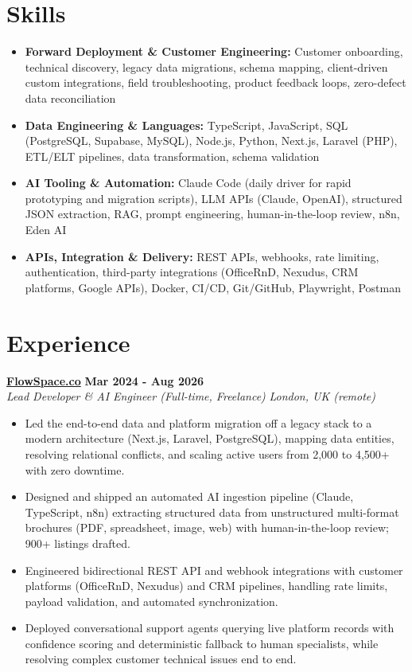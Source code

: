 \documentclass[a4paper,10pt]{article}
\newcommand{\role}[4]{%
 \textbf{#1} \hfill \textbf{#2}\\[1pt]%
 \textit{#3} \hfill \textit{#4}\\[2pt]%
}
\begin{document}
\section{Skills}
\begin{itemize}
 \item \textbf{Forward Deployment \& Customer Engineering:} Customer onboarding, technical discovery, legacy data migrations, schema mapping, client-driven custom integrations, field troubleshooting, product feedback loops, zero-defect data reconciliation
 \item \textbf{Data Engineering \& Languages:} TypeScript, JavaScript, SQL (PostgreSQL, Supabase, MySQL), Node.js, Python, Next.js, Laravel (PHP), ETL/ELT pipelines, data transformation, schema validation
 \item \textbf{AI Tooling \& Automation:} Claude Code (daily driver for rapid prototyping and migration scripts), LLM APIs (Claude, OpenAI), structured JSON extraction, RAG, prompt engineering, human-in-the-loop review, n8n, Eden AI
 \item \textbf{APIs, Integration \& Delivery:} REST APIs, webhooks, rate limiting, authentication, third-party integrations (OfficeRnD, Nexudus, CRM platforms, Google APIs), Docker, CI/CD, Git/GitHub, Playwright, Postman
\end{itemize}

\section{Experience}

\role{\href{https://flowspace.co}{FlowSpace.co}}{Mar 2024 - Aug 2026}{Lead Developer \& AI Engineer (Full-time, Freelance)}{London, UK (remote)}
\begin{itemize}
 \item Led the end-to-end data and platform migration off a legacy stack to a modern architecture (Next.js, Laravel, PostgreSQL), mapping data entities, resolving relational conflicts, and scaling active users from 2,000 to 4,500+ with zero downtime.
 \item Designed and shipped an automated AI ingestion pipeline (Claude, TypeScript, n8n) extracting structured data from unstructured multi-format brochures (PDF, spreadsheet, image, web) with human-in-the-loop review; 900+ listings drafted.
 \item Engineered bidirectional REST API and webhook integrations with customer platforms (OfficeRnD, Nexudus) and CRM pipelines, handling rate limits, payload validation, and automated synchronization.
 \item Deployed conversational support agents querying live platform records with confidence scoring and deterministic fallback to human specialists, while resolving complex customer technical issues end to end.
\end{itemize}
\end{document}
